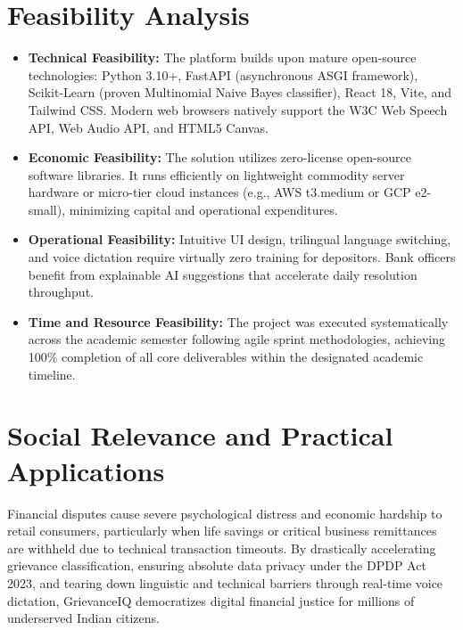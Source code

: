 \section{Feasibility Analysis}
\begin{itemize}
    \item \textbf{Technical Feasibility:} The platform builds upon mature open-source technologies: Python 3.10+, FastAPI (asynchronous ASGI framework), Scikit-Learn (proven Multinomial Naive Bayes classifier), React 18, Vite, and Tailwind CSS. Modern web browsers natively support the W3C Web Speech API, Web Audio API, and HTML5 Canvas.
    \item \textbf{Economic Feasibility:} The solution utilizes zero-license open-source software libraries. It runs efficiently on lightweight commodity server hardware or micro-tier cloud instances (e.g., AWS t3.medium or GCP e2-small), minimizing capital and operational expenditures.
    \item \textbf{Operational Feasibility:} Intuitive UI design, trilingual language switching, and voice dictation require virtually zero training for depositors. Bank officers benefit from explainable AI suggestions that accelerate daily resolution throughput.
    \item \textbf{Time and Resource Feasibility:} The project was executed systematically across the academic semester following agile sprint methodologies, achieving 100\% completion of all core deliverables within the designated academic timeline.
\end{itemize}

\section{Social Relevance and Practical Applications}
Financial disputes cause severe psychological distress and economic hardship to retail consumers, particularly when life savings or critical business remittances are withheld due to technical transaction timeouts. By drastically accelerating grievance classification, ensuring absolute data privacy under the DPDP Act 2023, and tearing down linguistic and technical barriers through real-time voice dictation, GrievanceIQ democratizes digital financial justice for millions of underserved Indian citizens.

